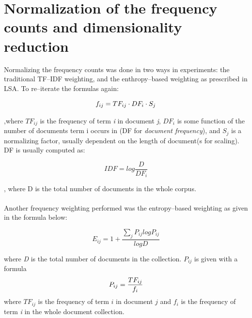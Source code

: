 \section{Normalization of the frequency counts and dimensionality reduction}
Normalizing the frequency counts was done in two ways in experiments: the traditional TF--IDF weighting, and the enthropy--based weighting as prescribed in LSA. To re--iterate the formulas again:
 \begin{center}
\begin{equation}\large{f_{ij} = TF_{ij} \cdot DF_{i} \cdot S_{j}}
\end{equation}
\end{center}
,where $TF_{ij}$  is the frequency of term \textit{i} in document \textit{j}, $DF_{i}$ is some function of the number of documents term i occurs in (DF for \textit{document frequency}), and $S_{j}$ is a normalizing factor, usually dependent on the length of document(s for scaling).
DF is usually computed as:
\begin{center}\large{
\begin{equation}IDF = log \frac{D}{DF_{i}}
\end{equation}
}
\end{center}
, where D is the total number of documents in the whole corpus. 
\\\\  
Another frequency weighting performed was the entropy--based weighting as given in the formula below:
\begin{center}\large
\begin{equation}E_{ij}=1+  \frac{\sum_{j}{P_{ij}log P_{ij}}}{logD}
\end{equation}
\end{center}
where \textit{D} is the total number of documents in the collection. $P_{ij}$ is given with a formula
\begin{equation}\large{P_{ij} = \frac{TF_{ij}}{f_{i}}} \end{equation}
where $TF_{ij}$ is the frequency of term $i$ in document $j$ and $f_{i}$ is the frequency of term \textit{i} in the whole document collection.

